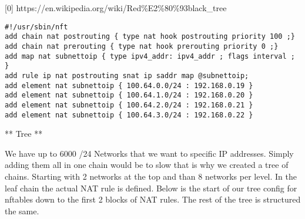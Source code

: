 {[}0{]} https://en.wikipedia.org/wiki/Red\%E2\%80\%93black\_tree

\begin{verbatim}
#!/usr/sbin/nft
add chain nat postrouting { type nat hook postrouting priority 100 ;}
add chain nat prerouting { type nat hook prerouting priority 0 ;}
add map nat subnettoip { type ipv4_addr: ipv4_addr ; flags interval ; }
add rule ip nat postrouting snat ip saddr map @subnettoip;
add element nat subnettoip { 100.64.0.0/24 : 192.168.0.19 }
add element nat subnettoip { 100.64.1.0/24 : 192.168.0.20 }
add element nat subnettoip { 100.64.2.0/24 : 192.168.0.21 }
add element nat subnettoip { 100.64.3.0/24 : 192.168.0.22 }
\end{verbatim}

** Tree **

We have up to 6000 /24 Networks that we want to specific IP addresses.
Simply adding them all in one chain would be to slow that is why we
created a tree of chains. Starting with 2 networks at the top and than 8
networks per level. In the leaf chain the actual NAT rule is defined.
Below is the start of our tree config for nftables down to the first 2
blocks of NAT rules. The rest of the tree is structured the same.

